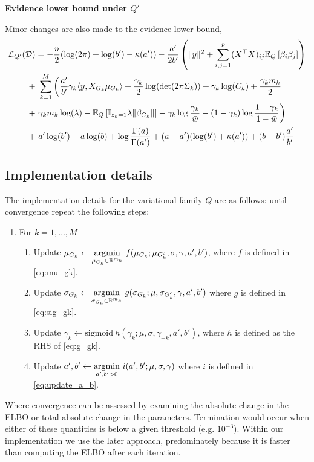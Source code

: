 \textbf{Evidence lower bound under $Q'$}

Minor changes are also made to the evidence lower bound,
\begin{equation} \label{eq:QD_elbo} 
\begin{aligned}
    \mathcal{L}_{Q'}(\mathcal{D}) &= 
- 
    \frac{n}{2} (\log(2 \pi) + \log(b') - \kappa(a'))
- 
    \frac{a'}{2b'} \left( \| y \|^2  + \sum_{i,j=1}^p(X^\top X)_{ij} \mathbb{E}_Q \left[ \beta_i \beta_j \right] \right)\\
+ &\
    \sum_{k=1}^M \bigg(  
\frac{a'}{b'} \gamma_k \langle y, X_{G_k} \mu_{G_k} \rangle
+
    \frac{\gamma_k}{2} \log( \det (2 \pi \Sigma_k))
+
    \gamma_k \log(C_k)
+ 
    \frac{\gamma_k m_k}{2} \\
+ &\
    \gamma_k m_k \log (\lambda)
-
    \mathbb{E}_Q \left[ \mathbb{I}_{z_k =1} \lambda \| \beta_{G_k} \| \right]
-
    \gamma_k \log \frac{\gamma_k}{\bar{w}}
-
    (1-\gamma_k) \log \frac{1 - \gamma_k}{1 - \bar{w}}
\bigg) \\
+ &\
    a' \log (b') - a \log(b) + \log \frac{\Gamma(a)}{\Gamma(a')} + (a-a')(\log(b') + \kappa(a')) + (b - b')\frac{a'}{b'}
\end{aligned}
\end{equation}

\subsection{Implementation details}

The implementation details for the variational family $Q$ are as follows: until convergence repeat the following steps:
\begin{enumerate}
    \item For $k=1,\dots,M$
    \begin{enumerate}
	\item Update $\mu_{G_k} \leftarrow \underset{\mu_{G_k} \in \mathbb{R}^{m_k}}{{\arg\!\min}}\ f(\mu_{G_k}; \mu_{G_k^c}, \sigma, \gamma, a', b')$, where $f$ is defined in \eqref{eq:mu_gk}.
	\item Update $\sigma_{G_k} \leftarrow \underset{\sigma_{G_k} \in \mathbb{R}^{m_k}}{{\arg\!\min}}\ g(\sigma_{G_k}; \mu, \sigma_{G_k^c}, \gamma, a', b')$ where $g$ is defined in \eqref{eq:sig_gk}.
	\item Update $\gamma_k \leftarrow \text{sigmoid} \ h(\gamma_k; \mu, \sigma, \gamma_{-k}, a', b')$, where $h$ is defined as the RHS of \eqref{eq:g_gk}.
	\item Update $a', b' \leftarrow \underset{a', b' > 0}{{\arg\!\min}}\ i(a', b'; \mu, \sigma, \gamma)$ where $i$ is defined in \eqref{eq:update_a_b}.
    \end{enumerate}
\end{enumerate}
Where convergence can be assessed by examining the absolute change in the ELBO or total absolute change in the parameters. Termination would occur when either of these quantities is below a given threshold (e.g. $10^{-3}$). Within our implementation we use the later approach, predominately because it is faster than computing the ELBO after each iteration.

